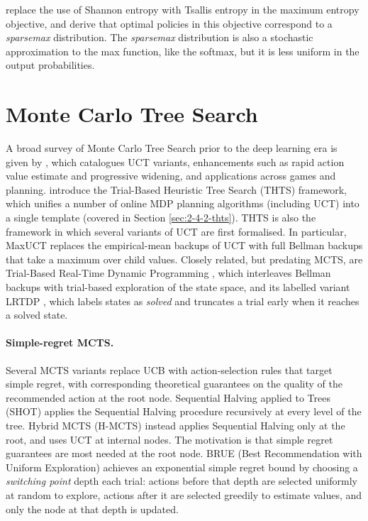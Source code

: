     \citet{tsallis_rl} replace the use of Shannon entropy with Tsallis entropy in the maximum entropy objective, and derive that optimal policies in this objective correspond to a \textit{sparsemax} distribution. The \textit{sparsemax} distribution is also a stochastic approximation to the max function, like the softmax, but it is less uniform in the output probabilities.








\section{Monte Carlo Tree Search}
\label{sec:3-3-mcts}

    A broad survey of Monte Carlo Tree Search prior to the deep learning era is given by \citet{mcts_survey}, which catalogues UCT variants, enhancements such as rapid action value estimate and progressive widening, and applications across games and planning. \citet{thts} introduce the Trial-Based Heuristic Tree Search (THTS) framework, which unifies a number of online MDP planning algorithms (including UCT) into a single template (covered in Section \ref{sec:2-4-2-thts}). THTS is also the framework in which several variants of UCT are first formalised. In particular, MaxUCT replaces the empirical-mean backups of UCT with full Bellman backups that take a maximum over child values. Closely related, but predating MCTS, are Trial-Based Real-Time Dynamic Programming \cite{rtdp}, which interleaves Bellman backups with trial-based exploration of the state space, and its labelled variant LRTDP \cite{lrtdp}, which labels states as \textit{solved} and truncates a trial early when it reaches a solved state.

    \paragraph{Simple-regret MCTS.}
    Several MCTS variants replace UCB with action-selection rules that target simple regret, with corresponding theoretical guarantees on the quality of the recommended action at the root node. Sequential Halving applied to Trees (SHOT) \cite{shot} applies the Sequential Halving procedure \cite{seq_halving} recursively at every level of the tree. Hybrid MCTS (H-MCTS) \cite{hmcts} instead applies Sequential Halving only at the root, and uses UCT at internal nodes. The motivation is that simple regret guarantees are most needed at the root node. BRUE \cite{brue} (Best Recommendation with Uniform Exploration) achieves an exponential simple regret bound by choosing a \textit{switching point} depth each trial: actions before that depth are selected uniformly at random to explore, actions after it are selected greedily to estimate values, and only the node at that depth is updated.

